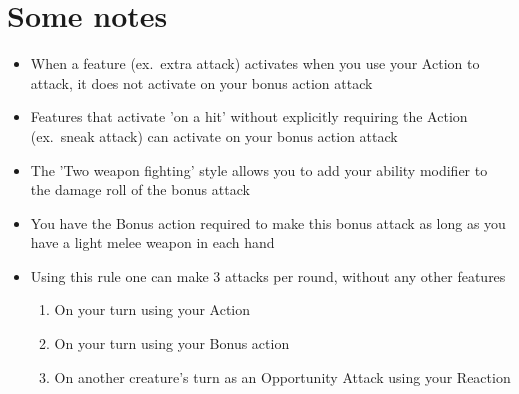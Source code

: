 \documentclass[a4paper]{article}
\begin{document}
\section{Some notes}
\begin{itemize}
\item When a feature (ex.\ extra attack) activates when you use your Action to attack, it does not activate on your bonus action attack
\item Features that activate 'on a hit' without explicitly requiring the Action (ex.\ sneak attack) can activate on your bonus action attack
\item The 'Two weapon fighting' style allows you to add your ability modifier to the damage roll of the bonus attack
\item You have the Bonus action required to make this bonus attack as long as you have a light melee weapon in each hand
\item Using this rule one can make 3 attacks per round, without any other features
	\begin{enumerate}
	\item On your turn using your Action
	\item On your turn using your Bonus action
	\item On another creature's turn as an Opportunity Attack using your Reaction
	\end{enumerate}
\end{itemize}
\end{document}
